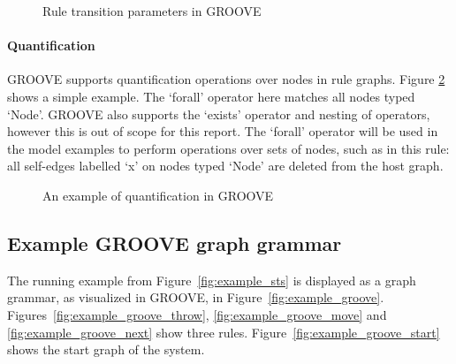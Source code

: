 \begin{figure}[h]
  \begin{center}
    \hspace{20px}
    \hspace{20px}
    \subfloat[GTS]{\label{fig:transition_parameters_gts}}
  \end{center}
  \caption{Rule transition parameters in GROOVE}
  \label{fig:transition_parameters}
\end{figure}

\paragraph*{Quantification}
GROOVE supports quantification operations over nodes in rule graphs. Figure \ref{fig:quantification} shows a simple example. The `forall' operator here matches all nodes typed `Node'. GROOVE also supports the `exists' operator and nesting of operators, however this is out of scope for this report. The `forall' operator will be used in the model examples to perform operations over sets of nodes, such as in this rule: all self-edges labelled `x' on nodes typed `Node' are deleted from the host graph. 

\begin{figure}[h]
  \begin{center}
    
  \end{center}
  \caption{An example of quantification in GROOVE}
  \label{fig:quantification}
\end{figure}

\subsection{Example GROOVE graph grammar}\label{sec:example_groove} 
The running example from Figure~\ref{fig:example_sts} is displayed as a graph grammar, as visualized in GROOVE, in Figure~\ref{fig:example_groove}. Figures~\ref{fig:example_groove_throw}, \ref{fig:example_groove_move} and \ref{fig:example_groove_next} show three rules. Figure~\ref{fig:example_groove_start} shows the start graph of the system.

